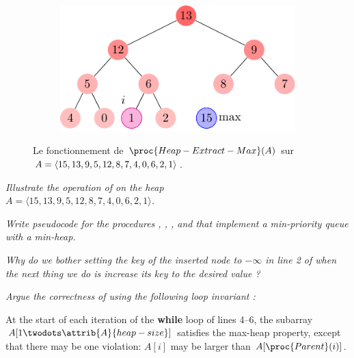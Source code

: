 \begin{description}
\begin{ex}
\begin{figure}[H]
\begin{subfigure}[t]{.40\textwidth}
          \centering
          \includegraphics[scale=0.8]{img/6_5-1/6_5-1_6}
          \caption{}\label{fig:6_5-1_6}
        \end{subfigure}
        \caption{Le fonctionnement de $\proc{Heap-Extract-Max}(A)$ sur $A = \langle 15, 13, 9, 5, \\12, 8, 7, 4, 0, 6, 2,1 \rangle$.} 
        \label{fig:Heap-Extract-Max}
      \end{figure}
        \end{ex}
     \textit{Illustrate the operation of  on the heap \\$A = \langle 15, 13, 9, 5, 12, 8, 7, 4, 0, 6, 2,1 \rangle$.}
        \begin{exrev}
          
        \end{exrev}
     \textit{Write pseudocode for the procedures , , , and  that implement a min-priority queue with a min-heap.}
        \begin{exrev}
          
        \end{exrev}
     \textit{Why do we bother setting the key of the inserted node to $-\infty$ in line 2 of  when the next thing we do is increase its key to the desired value ?}
        \begin{exrev}
          
        \end{exrev}
     {\itshape Argue the correctness of  using the following loop invariant :

At the start of each iteration of the \textbf{while} loop of lines 4–6, the subarray
$A[1 \twodots \attrib{A}{heap-size}]$ satisfies the max-heap property, except that there may
be one violation: $A[i]$ may be larger than $A[\proc{Parent}(i)]$.

}
\end{description}

